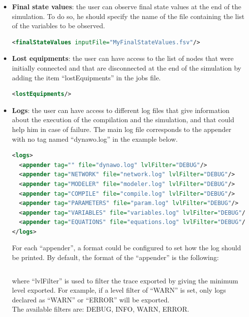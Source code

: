 \documentclass[a4paper, 12pt]{report}
\begin{document}
\begin{itemize}
\item \textbf{Final state values}: the user can observe final state values at the end of the simulation. To do so, he should specify the name of the file containing the list of the variables to be observed.

\begin{lstlisting}[language=XML, morekeywords={finalStateValues},numbers=none]
<finalStateValues inputFile="MyFinalStateValues.fsv"/>
\end{lstlisting}

\item \textbf{Lost equipments}:  the user can have access to the list of nodes that were initially connected and that are disconnected at the end of the simulation by adding the item ``lostEquipments'' in the jobs file.

\begin{lstlisting}[language=XML, morekeywords={lostEquipments},numbers=none]
<lostEquipments/>
\end{lstlisting}

\item \textbf{Logs}: the user can have access to different log files that give information about the execution of the compilation and the simulation, and that could help him in case of failure. The main log file corresponds to the appender with no tag named ``dynawo.log'' in the example below.
\begin{lstlisting}[language=XML, morekeywords={logs}]
<logs>
  <appender tag="" file="dynawo.log" lvlFilter="DEBUG"/>
  <appender tag="NETWORK" file="network.log" lvlFilter="DEBUG"/>
  <appender tag="MODELER" file="modeler.log" lvlFilter="DEBUG"/>
  <appender tag="COMPILE" file="compile.log" lvlFilter="DEBUG"/>
  <appender tag="PARAMETERS" file="param.log" lvlFilter="DEBUG"/>
  <appender tag="VARIABLES" file="variables.log" lvlFilter="DEBUG"/>
  <appender tag="EQUATIONS" file="equations.log" lvlFilter="DEBUG"/>
</logs>
\end{lstlisting}

For each ``appender'', a format could be configured to set how the log should be printed. By default, the format of the ``appender'' is the following:
\begin{lstlisting}[numbers=none]
%Y-%m-%d %H:%M:%S | <lvlFilter> | log
\end{lstlisting}

where ``lvlFilter'' is used to filter the trace exported by giving the minimum level exported. For example, if a level filter of ``WARN'' is set, only logs declared as ``WARN'' or ``ERROR'' will be exported. \\

The available filters are: DEBUG, INFO, WARN, ERROR.
\end{itemize}
\end{document}
